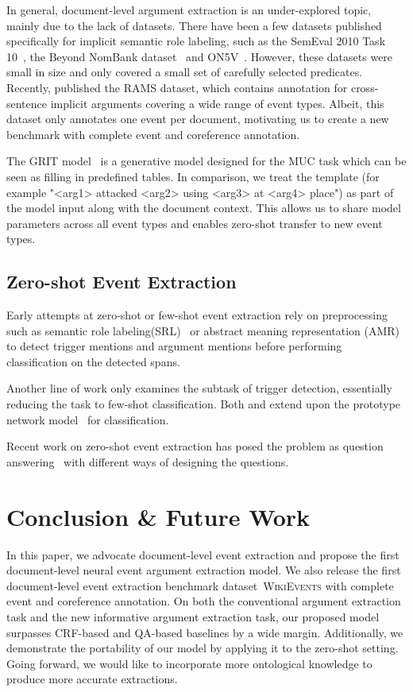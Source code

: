 In general, document-level argument extraction is an under-explored topic, mainly due to the lack of datasets.
There have been a few datasets published specifically for implicit semantic role labeling, such as the SemEval 2010 Task 10~\cite{Ruppenhofer2010SemEval2010T1}, the Beyond NomBank dataset~\cite{Gerber2010BeyondNA} and ON5V~\cite{Moor2013PredicatespecificAF}. However, these datasets were small in size and only covered a small set of carefully selected predicates. 
Recently, \cite{Ebner2020RAMS} published the RAMS dataset, which contains annotation for cross-sentence implicit arguments covering a wide range of event types.
Albeit, this dataset only annotates one event per document, motivating us to create a new benchmark with complete event and coreference annotation.

The GRIT model~\cite{Du2020GRITGR} is a generative model designed for the MUC task which can be seen as filling in predefined tables.  
In comparison, we treat the template (for example "<arg1> attacked <arg2> using <arg3> at <arg4> place") as part of the model input along with the document context. This allows us to share model parameters across all event types and enables zero-shot transfer to new event types. 

\subsection{Zero-shot Event Extraction}
Early attempts at zero-shot or few-shot event extraction rely on preprocessing such as semantic role labeling(SRL)~\cite{Peng2016EventDA} or abstract meaning representation (AMR)~\cite{Huang2018ZeroShotTL} to detect trigger mentions and argument mentions before performing classification on the detected spans.

Another line of work only examines the subtask of trigger detection, essentially reducing the task to few-shot classification. Both \cite{Lai2020ExtensivelyMF} and \cite{Deng2020MetaLearningWD} extend upon the prototype network model~\cite{Snell2017PrototypicalNF} for classification.

Recent work on zero-shot event extraction has posed the problem as question answering~\cite{Chen2019ReadingTheManual, Du2020EventQA, Feng2020ProbingAF} with different ways of designing the questions.

\section{Conclusion \& Future Work}
In this paper, we advocate document-level event extraction and propose the first document-level neural event argument extraction model. 
We also release the first document-level event extraction benchmark dataset~\textsc{WikiEvents} with complete event and coreference annotation.
On both the conventional argument extraction task and the new informative argument extraction task, our proposed model surpasses CRF-based and QA-based baselines by a wide margin.
Additionally, we demonstrate the portability of our model by applying it to the zero-shot setting. 
Going forward, we would like to incorporate more ontological knowledge to produce more accurate extractions.

